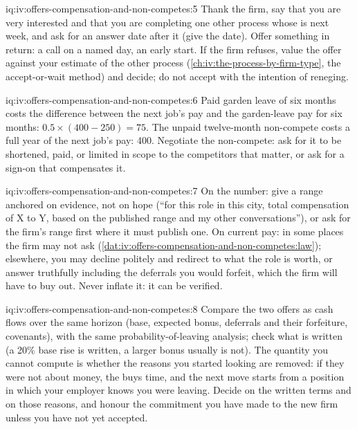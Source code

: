 \begin{solution}{iq:iv:offers-compensation-and-non-competes:5}
Thank the firm, say that you are very interested and that you are completing one other process whose  is next week, and ask for an answer date after it (give the date). Offer something in return: a call on
a named day, an early start. If the firm refuses, value the offer against your estimate of the other process
(\cref{ch:iv:the-process-by-firm-type}, the accept-or-wait method) and decide; do not accept with the intention
of reneging.
\end{solution}

\begin{solution}{iq:iv:offers-compensation-and-non-competes:6}
Paid garden leave of six months costs the difference between the next job's pay and the garden-leave pay for
six months: $0.5 \times (400 - 250) = 75$. The unpaid twelve-month non-compete costs a full year of the next
job's pay: 400. Negotiate the non-compete: ask for it to be shortened, paid, or limited in scope to the
competitors that matter, or ask for a sign-on that compensates it.
\end{solution}

\begin{solution}{iq:iv:offers-compensation-and-non-competes:7}
On the number: give a range anchored on evidence, not on hope (``for this role in this city, total compensation
of X to Y, based on the published range and my other conversations''), or ask for the firm's range first where
it must publish one. On current pay: in some places the firm may not ask
(\cref{dat:iv:offers-compensation-and-non-competes:law}); elsewhere, you may decline politely and redirect to
what the role is worth, or answer truthfully including the deferrals you would forfeit, which the firm will
have to buy out. Never inflate it: it can be verified.
\end{solution}

\begin{solution}{iq:iv:offers-compensation-and-non-competes:8}
Compare the two offers as cash flows over the same horizon (base, expected bonus, deferrals and their
forfeiture, covenants), with the same probability-of-leaving analysis; check what is written (a 20\% base rise
is written, a larger bonus usually is not). The quantity you cannot compute is whether the reasons you started
looking are removed: if they were not about money, the  buys time, and the next move starts from a
position in which your employer knows you were leaving. Decide on the written terms and on those reasons, and
honour the commitment you have made to the new firm unless you have not yet accepted.
\end{solution}

